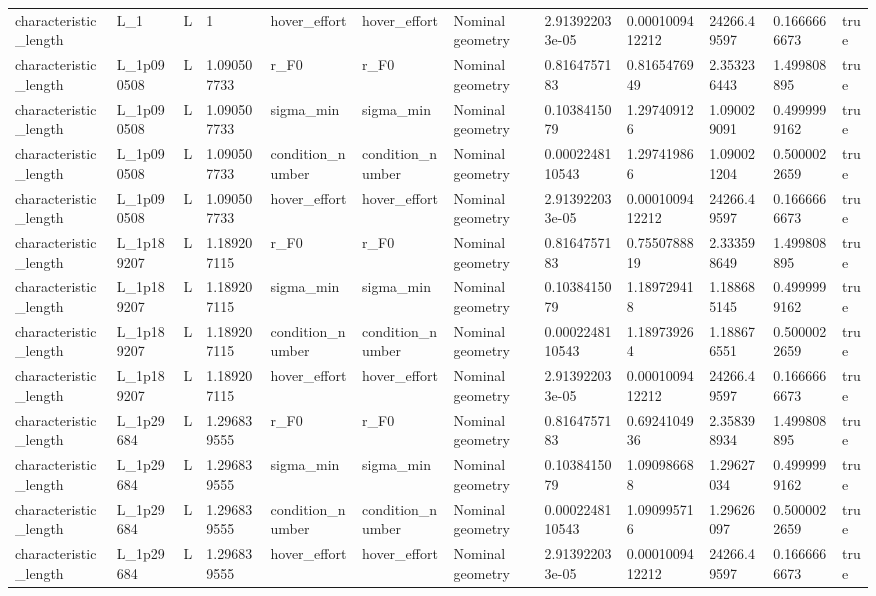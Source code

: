 \begin{tabular}{@{}llllllllllll@{}}
characteristic\_length & L\_1 & L & 1 & hover\_effort & hover\_effort & Nominal geometry & 2.913922033e-05 & 0.0001009412212 & 24266.49597 & 0.1666666673 & true \\
characteristic\_length & L\_1p090508 & L & 1.090507733 & r\_F0 & r\_F0 & Nominal geometry & 0.8164757183 & 0.8165476949 & 2.353236443 & 1.499808895 & true \\
characteristic\_length & L\_1p090508 & L & 1.090507733 & sigma\_min & sigma\_min & Nominal geometry & 0.1038415079 & 1.297409126 & 1.090029091 & 0.4999999162 & true \\
characteristic\_length & L\_1p090508 & L & 1.090507733 & condition\_number & condition\_number & Nominal geometry & 0.0002248110543 & 1.297419866 & 1.090021204 & 0.5000022659 & true \\
characteristic\_length & L\_1p090508 & L & 1.090507733 & hover\_effort & hover\_effort & Nominal geometry & 2.913922033e-05 & 0.0001009412212 & 24266.49597 & 0.1666666673 & true \\
characteristic\_length & L\_1p189207 & L & 1.189207115 & r\_F0 & r\_F0 & Nominal geometry & 0.8164757183 & 0.7550788819 & 2.333598649 & 1.499808895 & true \\
characteristic\_length & L\_1p189207 & L & 1.189207115 & sigma\_min & sigma\_min & Nominal geometry & 0.1038415079 & 1.189729418 & 1.188685145 & 0.4999999162 & true \\
characteristic\_length & L\_1p189207 & L & 1.189207115 & condition\_number & condition\_number & Nominal geometry & 0.0002248110543 & 1.189739264 & 1.188676551 & 0.5000022659 & true \\
characteristic\_length & L\_1p189207 & L & 1.189207115 & hover\_effort & hover\_effort & Nominal geometry & 2.913922033e-05 & 0.0001009412212 & 24266.49597 & 0.1666666673 & true \\
characteristic\_length & L\_1p29684 & L & 1.296839555 & r\_F0 & r\_F0 & Nominal geometry & 0.8164757183 & 0.6924104936 & 2.358398934 & 1.499808895 & true \\
characteristic\_length & L\_1p29684 & L & 1.296839555 & sigma\_min & sigma\_min & Nominal geometry & 0.1038415079 & 1.090986688 & 1.29627034 & 0.4999999162 & true \\
characteristic\_length & L\_1p29684 & L & 1.296839555 & condition\_number & condition\_number & Nominal geometry & 0.0002248110543 & 1.090995716 & 1.29626097 & 0.5000022659 & true \\
characteristic\_length & L\_1p29684 & L & 1.296839555 & hover\_effort & hover\_effort & Nominal geometry & 2.913922033e-05 & 0.0001009412212 & 24266.49597 & 0.1666666673 & true \\

\end{tabular}
